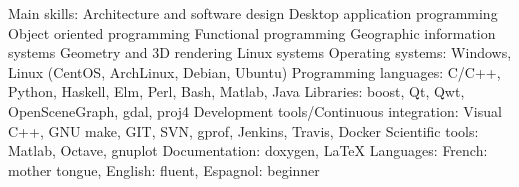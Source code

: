 \begin{cvskills}
  \cvskill
    {Main skills:}
 	{
		Architecture and software design\newline
		Desktop application programming\newline
        Object oriented programming\newline
        Functional programming\newline
        Geographic information systems\newline
        Geometry and 3D rendering\newline
        Linux systems
	}
  \cvskill
    {Operating systems:}
 	{Windows, Linux (CentOS, ArchLinux, Debian, Ubuntu)}
  \cvskill
    {Programming languages:}
 	{C/C++, Python, Haskell, Elm, Perl, Bash, Matlab, Java}
  \cvskill
    {Libraries:}
 	{boost, Qt, Qwt, OpenSceneGraph, gdal, proj4}
  \cvskill
	{Development tools/Continuous integration:}
	{Visual C++, GNU make, GIT, SVN, gprof, Jenkins, Travis, Docker}
  \cvskill
	{Scientific tools:}
	{Matlab, Octave, gnuplot}
  \cvskill
	{Documentation:}
	{doxygen, \LaTeX}
  \cvskill
    {Languages:}
 	{
        French: mother tongue,
		English: fluent,
		Espagnol: beginner
	}
\end{cvskills}

